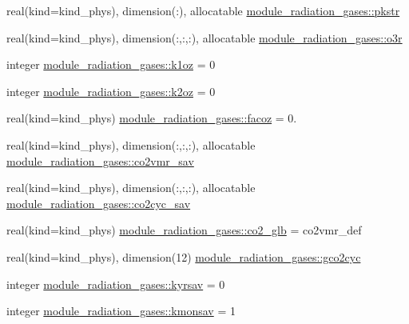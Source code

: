 \begin{DoxyCompactItemize}
\item 
real(kind=kind\+\_\+phys), dimension(\+:), allocatable \hyperlink{namespacemodule__radiation__gases_ac7466def3963591ebfc48298806b1f6a}{module\+\_\+radiation\+\_\+gases\+::pkstr}
\item 
real(kind=kind\+\_\+phys), dimension(\+:,\+:,\+:), allocatable \hyperlink{namespacemodule__radiation__gases_ad18392d991a9ef4b6ff0e8e822176a18}{module\+\_\+radiation\+\_\+gases\+::o3r}
\item 
integer \hyperlink{namespacemodule__radiation__gases_a0a14666484f230d3506a9b4740e2eeda}{module\+\_\+radiation\+\_\+gases\+::k1oz} = 0
\item 
integer \hyperlink{namespacemodule__radiation__gases_a0c3727c9e2a0bec46e84622c4591cd8b}{module\+\_\+radiation\+\_\+gases\+::k2oz} = 0
\item 
real(kind=kind\+\_\+phys) \hyperlink{namespacemodule__radiation__gases_ac7c9fd8ece69872fdef473020ea03d6b}{module\+\_\+radiation\+\_\+gases\+::facoz} = 0.
\item 
real(kind=kind\+\_\+phys), dimension(\+:,\+:,\+:), allocatable \hyperlink{namespacemodule__radiation__gases_a4f35e5db780a64963dc65b8449def39d}{module\+\_\+radiation\+\_\+gases\+::co2vmr\+\_\+sav}
\item 
real(kind=kind\+\_\+phys), dimension(\+:,\+:,\+:), allocatable \hyperlink{namespacemodule__radiation__gases_a3985e306e5555089909fd42a4cc93afb}{module\+\_\+radiation\+\_\+gases\+::co2cyc\+\_\+sav}
\item 
real(kind=kind\+\_\+phys) \hyperlink{namespacemodule__radiation__gases_a0398d6837c9e8c41359e76a754147002}{module\+\_\+radiation\+\_\+gases\+::co2\+\_\+glb} = co2vmr\+\_\+def
\item 
real(kind=kind\+\_\+phys), dimension(12) \hyperlink{namespacemodule__radiation__gases_ac2a03ad96c9aa598f9751fd689cb615f}{module\+\_\+radiation\+\_\+gases\+::gco2cyc}
\item 
integer \hyperlink{namespacemodule__radiation__gases_a6b4372e633bef3fb367e6ff3cf200bb8}{module\+\_\+radiation\+\_\+gases\+::kyrsav} = 0
\item 
integer \hyperlink{namespacemodule__radiation__gases_ab1cf1b63398a3e7ec0334a7c97258b4d}{module\+\_\+radiation\+\_\+gases\+::kmonsav} = 1
\end{DoxyCompactItemize}
